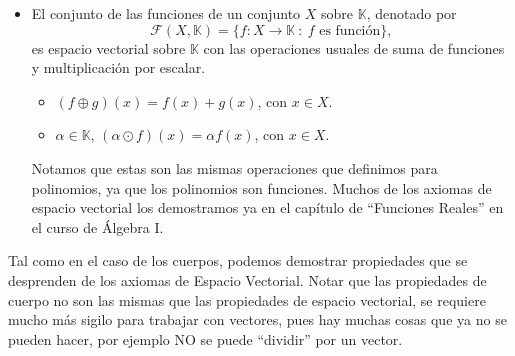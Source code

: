 \documentclass[12pt]{book}
\def\K{\mathbb{K}}
\def\F{\mathcal{F}}
\begin{document}
\begin{itemize}
\item El conjunto de las funciones de un conjunto $X$ sobre $\K$, denotado por $$\F(X,\K)=\{ f:X\rightarrow \K\ :\ f\textrm{ es función}\},$$ es espacio vectorial sobre $\K$ con las operaciones usuales de suma de funciones y multiplicaci\'on por escalar.

\begin{itemize}
\item $(f \oplus g)(x)=f(x) + g(x)$, con $x\in X$.
\item $\alpha\in\K$, $(\alpha \odot f)(x)=\alpha f(x)$, con $x\in X$.
\end{itemize}
Notamos que estas son las mismas operaciones que definimos para polinomios, ya que los polinomios son funciones.
Muchos de los axiomas de espacio vectorial los demostramos ya en el capítulo de ``Funciones Reales'' en el curso de Álgebra I.
\end{itemize}

Tal como en el caso de los cuerpos, podemos demostrar propiedades que se desprenden de los axiomas de Espacio Vectorial.
Notar que las propiedades de cuerpo no son las mismas que las propiedades de espacio vectorial, se requiere mucho más sigilo para trabajar con vectores, pues hay muchas cosas que ya no se pueden hacer, por ejemplo NO se puede ``dividir'' por un vector.
\end{document}
